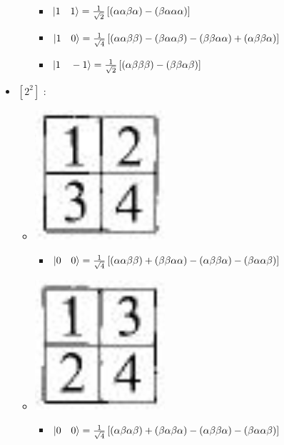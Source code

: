 \documentclass[12pt,a4paper]{article}
\begin{document}
\begin{itemize}
\begin{itemize}
\begin{itemize}
\item $\ket{1\quad 1} = \frac{1}{\sqrt{2}}  \left[ 
\left( \alpha\alpha\beta\alpha \right) - \left( \beta\alpha\alpha\alpha\right) 
 \right]$
\item  $\ket{1\quad 0} = \frac{1}{\sqrt{4}}  \left[ 
\left( \alpha\alpha\beta\beta \right) - \left( \beta\alpha\alpha\beta\right) -
\left( \beta\beta\alpha\alpha  \right) + \left( \alpha\beta\beta\alpha \right)
 \right]$ 
\item  $\ket{1\quad -1} = \frac{1}{\sqrt{2}}  \left[ 
\left( \alpha\beta\beta\beta \right) - \left( \beta\beta\alpha\beta \right) 
 \right]$
\end{itemize}
\end{itemize}
\item $\left[ 2 ^2 \right]$ : 
\begin{itemize}
\item \includegraphics[scale=0.2]{build/young-2hoch2-12.png}
\begin{itemize}
\item  $\ket{0\quad 0} = \frac{1}{\sqrt{4}}  \left[ 
\left(\alpha\alpha\beta\beta \right) + \left( \beta\beta\alpha\alpha \right) -
\left( \alpha\beta \beta\alpha\right) - \left( \beta\alpha\alpha\beta\right)
 \right]$
\end{itemize}
\item \includegraphics[scale=0.2]{build/young-2hoch2-13.png}
\begin{itemize}
\item  $\ket{0\quad 0} = \frac{1}{\sqrt{4}}  \left[ 
\left( \alpha\beta \alpha\beta\right) + \left( \beta\alpha\beta\alpha\right) 
 - \left( \alpha\beta\beta \alpha\right)  - \left( \beta\alpha\alpha\beta\right) 
 \right]$
\end{itemize}
\end{itemize}
\end{itemize}
\end{document}
